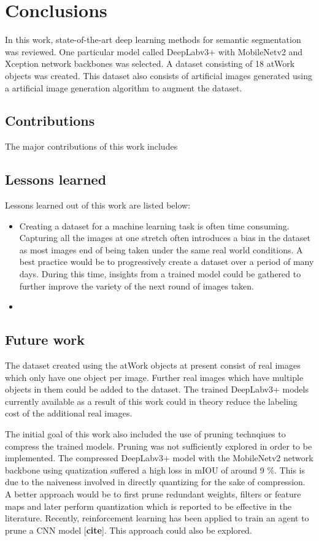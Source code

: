 
\chapter{Conclusions}

In this work, state-of-the-art deep learning methods for semantic segmentation was reviewed. One particular model called DeepLabv3+ with MobileNetv2 and Xception network backbones was selected. A dataset consisting of 18 atWork objects was created. This dataset also consists of artificial images generated using a artificial image generation algorithm to augment the dataset. 

\section{Contributions}

The major contributions of this work includes

\section{Lessons learned}

Lessons learned out of this work are listed below:
	\begin{itemize}
		\item Creating a dataset for a machine learning task is often time consuming. Capturing all the images at one stretch often introduces a bias in the dataset as most images end of being taken under the same real world conditions. A best practice would be to progressively create a dataset over a period of many days. During this time, insights from a trained model could be gathered to further improve the variety of the next round of images taken.
		\item 
	\end{itemize}

\section{Future work}

The dataset created using the atWork objects at present consist of real images which only have one object per image. Further real images which have multiple objects in them could be added to the dataset. The trained DeepLabv3+ models currently available as a result of this work could in theory reduce the labeling cost of the additional real images. 

The initial goal of this work also included the use of pruning technqiues to compress the trained models. Pruning was not sufficiently explored in order to be implemented. The compressed DeepLabv3+ model with the MobileNetv2 network backbone using quatization suffered a high loss in mIOU of around 9 \%. This is due to the naiveness involved in directly quantizing for the sake of compression. A better approach would be to first prune redundant weights, filters or feature maps and later perform quantization which is reported to be effective in the literature. Recently, reinforcement learning has been applied to train an agent to prune a CNN model [\textbf{cite}]. This approach could also be explored.

